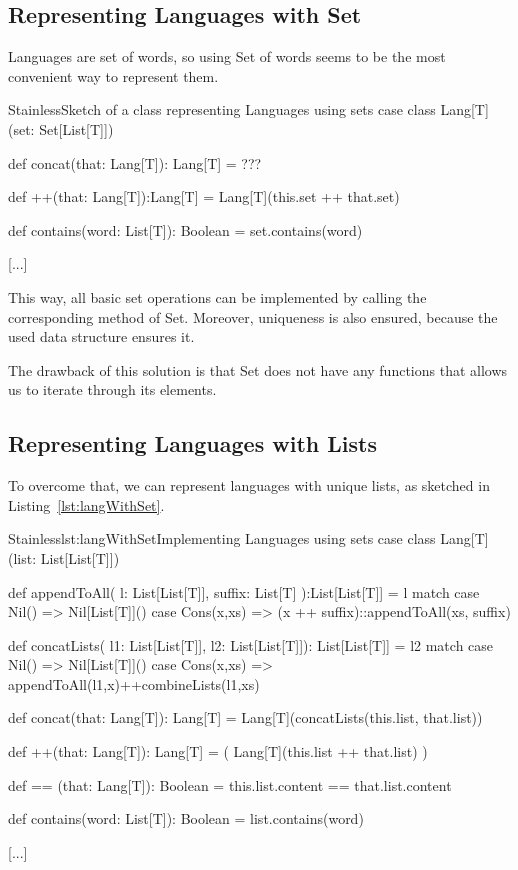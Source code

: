 \subsection{Representing Languages with Set}

Languages are set of words, so using Set of words seems to be the most convenient way to represent them.


\begin{Code}{Stainless}{}{Sketch of a class representing Languages using sets}
case class Lang[T](set: Set[List[T]]) {	
  
  def concat(that: Lang[T]): Lang[T] = ???
  
  def ++(that: Lang[T]):Lang[T] = Lang[T](this.set ++ that.set)
  
  def contains(word: List[T]): Boolean = set.contains(word)
  
  [...]
  
}
\end{Code}

This way, all basic set operations can be implemented by calling the corresponding method of Set. Moreover, uniqueness is also ensured, because the used data structure ensures it.

The drawback of this solution is that Set does not have any functions that allows us to iterate through its elements.

\subsection{Representing Languages with Lists}
\label{set:implList}

To overcome that, we can represent languages with unique lists, as sketched in Listing~\ref{lst:langWithSet}.

\begin{Code}{Stainless}{lst:langWithSet}{Implementing Languages using sets}
case class Lang[T](list: List[List[T]]) {

  def appendToAll( l: List[List[T]], 
                   suffix: List[T] ):List[List[T]] = l match {
    case Nil() => Nil[List[T]]()
    case Cons(x,xs) => (x ++ suffix)::appendToAll(xs, suffix)
  }

  def concatLists(
          l1: List[List[T]],
          l2: List[List[T]]):  List[List[T]] = l2 match {
    case Nil() => Nil[List[T]]()
    case Cons(x,xs) => appendToAll(l1,x)++combineLists(l1,xs)
  }
		
  def concat(that: Lang[T]): Lang[T] = {
    Lang[T](concatLists(this.list, that.list))
  }
  
  def ++(that: Lang[T]): Lang[T] = (
    Lang[T](this.list ++ that.list)
  )
	
  def == (that: Lang[T]): Boolean = {
    this.list.content == that.list.content
  }
	
  def contains(word: List[T]): Boolean = list.contains(word)
  
  [...]
  
}
\end{Code}

